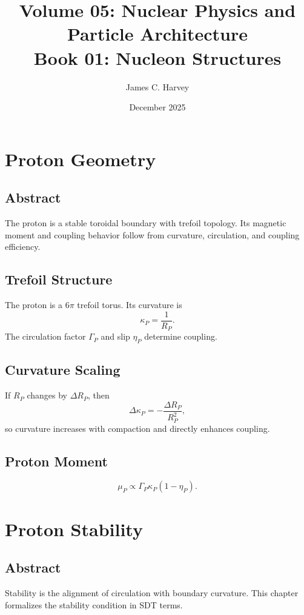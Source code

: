 \documentclass[12pt]{book}
\title{Volume 05: Nuclear Physics and Particle Architecture \\ Book 01: Nucleon Structures}
\author{James C. Harvey}
\date{December 2025}
\begin{document}
\maketitle
\tableofcontents

\chapter{Proton Geometry}

\section*{Abstract}
The proton is a stable toroidal boundary with trefoil topology. Its magnetic moment and coupling behavior
follow from curvature, circulation, and coupling efficiency.

\section{Trefoil Structure}
The proton is a $6\pi$ trefoil torus. Its curvature is
\begin{equation}
\kappa_P = \frac{1}{R_P}.
\end{equation}
The circulation factor $\Gamma_P$ and slip $\eta_P$ determine coupling.

\section{Curvature Scaling}
If $R_P$ changes by $\Delta R_P$, then
\begin{equation}
\Delta \kappa_P = -\frac{\Delta R_P}{R_P^2},
\end{equation}
so curvature increases with compaction and directly enhances coupling.

\section{Proton Moment}
\begin{equation}
\mu_P \propto \Gamma_P \kappa_P (1-\eta_P).
\end{equation}

\chapter{Proton Stability}

\section*{Abstract}
Stability is the alignment of circulation with boundary curvature. This chapter formalizes the stability
condition in SDT terms.
\end{document}

